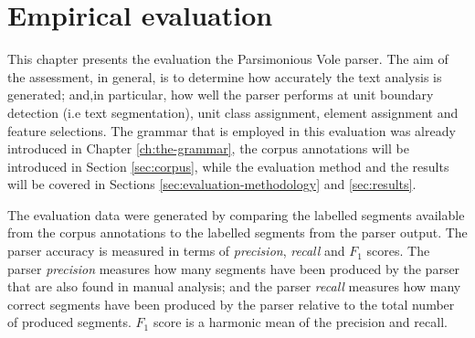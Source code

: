 \chapter{Empirical evaluation}



    This chapter presents the evaluation the Parsimonious Vole parser. The aim of the assessment, in general, is to determine how accurately the text analysis is generated; and,in particular, how well the parser performs at unit boundary detection (i.e text segmentation), unit class assignment, element assignment and feature selections. The grammar that is employed in this evaluation was already introduced in Chapter \ref{ch:the-grammar}, the corpus annotations will be introduced in Section \ref{sec:corpus}, while the evaluation method and the results will be covered in Sections \ref{sec:evaluation-methodology} and \ref{sec:results}. 
    
    The evaluation data were generated by comparing the labelled segments  available from the corpus annotations to the labelled segments from the parser output. The parser accuracy is measured in terms of \textit{precision}, \textit{recall} and $F_1$ scores. The parser \textit{precision} measures how many segments have been produced by the parser that are also found in manual analysis; and the parser \textit{recall} measures how many correct segments have been produced by the parser relative to the total number of produced segments. $F_1$ score is a harmonic mean of the precision and recall.
    

